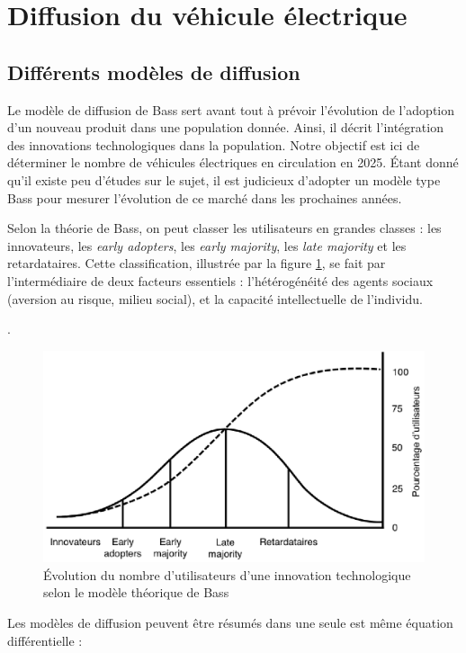 \section{Diffusion du véhicule électrique}

	\subsection{Différents modèles de diffusion}
	
		Le modèle de diffusion de Bass sert avant tout à prévoir l'évolution de l’adoption d’un nouveau produit dans une population donnée. Ainsi, il décrit l’intégration des innovations technologiques dans la population. Notre objectif est ici de déterminer le nombre de véhicules électriques en circulation en 2025. Étant donné qu'il existe peu d'études sur le sujet, il est judicieux d’adopter un modèle type Bass pour mesurer l'évolution de ce marché dans les prochaines années.
		
		
		Selon la théorie de Bass, on peut classer les utilisateurs en grandes classes : les innovateurs, les \textit{early adopters}, les \textit{early majority}, les \textit{late majority} et les retardataires. Cette classification, illustrée par la figure \ref{fig.BassUtilisateurs}, se fait par l’intermédiaire de deux facteurs essentiels : l’hétérogénéité des agents sociaux (aversion au risque, milieu social), et la capacité intellectuelle de l’individu.
		
	.
		\begin{figure}[h!]
			\caption{Évolution du nombre d'utilisateurs d'une innovation technologique selon le modèle théorique de Bass \label{fig.BassUtilisateurs}}
			\centering
			\includegraphics{fig/BassUtilisateurs.eps}
		\end{figure}
		
		Les modèles de diffusion peuvent être résumés dans une seule est même équation différentielle : 
	
